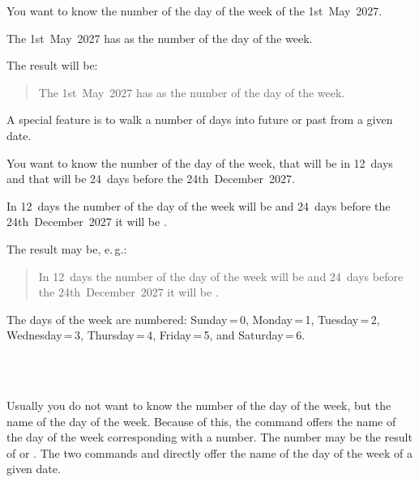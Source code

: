 \begin{Example}
  You want to know the number of the day of the week of the 1st~May~2027.
\begin{lstcode}
  The 1st~May~2027 has \the{}
  as the number of the day of the week.
\end{lstcode}
  The result will be:
  \begin{quote}
    The 1st~May~2027 has \the{}
    as the number of the day of the week.
  \end{quote}
\end{Example}

A special feature is to walk a number of days into future or past from a given
date.
\begin{Example}
  You want to know the number of the day of the week, that will be in 12~days
  and that will be 24~days before the 24th~December~2027.
\begin{lstcode}
  In 12~days the number of the day of the week
  will be \the{} and
  24~days before the 24th~December~2027 it will be
  \the{}.
\end{lstcode}
  The result may be, e.\,g.:
  \begin{quote}
    In 12~days the number of the day of the week
    will be \the{} and
    24~days before the 24th~December~2027 it will be
    \the{}.
  \end{quote}
\end{Example}

The days of the week are numbered: Sunday\,=\,0, Monday\,=\,1, Tuesday\,=\,2,
Wednesday\,=\,3, Thursday\,=\,4, Friday\,=\,5, and Saturday\,=\,6.%
%
\EndIndexGroup


\begin{Declaration}
  \\%
  \\%
\end{Declaration}%
Usually you do not want to know the number
of the day of the week, but the name of the day of the week. Because of this,
the command  offers the name of the day of the week
corresponding with a number. The number may be the result of 
or . The two commands  and
 directly offer the name of the day of the week of a given
date.

